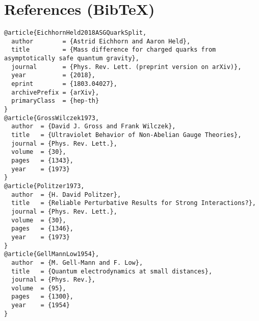 \documentclass[11pt]{article}
\begin{document}
  \section*{References (Bib\TeX)}
  \begin{verbatim}
@article{EichhornHeld2018ASGQuarkSplit,
  author        = {Astrid Eichhorn and Aaron Held},
  title         = {Mass difference for charged quarks from asymptotically safe quantum gravity},
  journal       = {Phys. Rev. Lett. (preprint version on arXiv)},
  year          = {2018},
  eprint        = {1803.04027},
  archivePrefix = {arXiv},
  primaryClass  = {hep-th}
}
@article{GrossWilczek1973,
  author  = {David J. Gross and Frank Wilczek},
  title   = {Ultraviolet Behavior of Non-Abelian Gauge Theories},
  journal = {Phys. Rev. Lett.},
  volume  = {30},
  pages   = {1343},
  year    = {1973}
}
@article{Politzer1973,
  author  = {H. David Politzer},
  title   = {Reliable Perturbative Results for Strong Interactions?},
  journal = {Phys. Rev. Lett.},
  volume  = {30},
  pages   = {1346},
  year    = {1973}
}
@article{GellMannLow1954},
  author  = {M. Gell-Mann and F. Low},
  title   = {Quantum electrodynamics at small distances},
  journal = {Phys. Rev.},
  volume  = {95},
  pages   = {1300},
  year    = {1954}
}
  \end{verbatim}





  \ifdefined\standalonechapter\else
  
\end{document}
